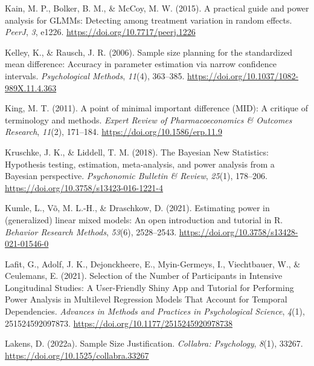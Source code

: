 \documentclass[
  man,
  floatsintext,
  longtable,
  a4paper,
  nolmodern,
  notxfonts,
  notimes,
  colorlinks=true,linkcolor=blue,citecolor=blue,urlcolor=blue]{apa7}
\newlength{\cslhangindent}
\newenvironment{CSLReferences}[2] %
 {\begin{list}{}{%
  \setlength{\itemindent}{0pt}
  \setlength{\leftmargin}{0pt}
  \setlength{\parsep}{0pt}
  \ifodd #1
   \setlength{\leftmargin}{\cslhangindent}
   \setlength{\itemindent}{-1\cslhangindent}
  \fi
  \setlength{\itemsep}{#2\baselineskip}}}
 {\end{list}}
\begin{document}
\begin{CSLReferences}{1}{0}
Kain, M. P., Bolker, B. M., \& McCoy, M. W. (2015). A practical guide
and power analysis for {GLMMs}: Detecting among treatment variation in
random effects. \emph{PeerJ}, \emph{3}, e1226.
\url{https://doi.org/10.7717/peerj.1226}

Kelley, K., \& Rausch, J. R. (2006). Sample size planning for the
standardized mean difference: {Accuracy} in parameter estimation via
narrow confidence intervals. \emph{Psychological Methods}, \emph{11}(4),
363--385. \url{https://doi.org/10.1037/1082-989X.11.4.363}

King, M. T. (2011). A point of minimal important difference ({MID}): A
critique of terminology and methods. \emph{Expert Review of
Pharmacoeconomics \& Outcomes Research}, \emph{11}(2), 171--184.
\url{https://doi.org/10.1586/erp.11.9}

Kruschke, J. K., \& Liddell, T. M. (2018). The {Bayesian New
Statistics}: {Hypothesis} testing, estimation, meta-analysis, and power
analysis from a {Bayesian} perspective. \emph{Psychonomic Bulletin \&
Review}, \emph{25}(1), 178--206.
\url{https://doi.org/10.3758/s13423-016-1221-4}

Kumle, L., Võ, M. L.-H., \& Draschkow, D. (2021). Estimating power in
(generalized) linear mixed models: {An} open introduction and tutorial
in {R}. \emph{Behavior Research Methods}, \emph{53}(6), 2528--2543.
\url{https://doi.org/10.3758/s13428-021-01546-0}

Lafit, G., Adolf, J. K., Dejonckheere, E., Myin-Germeys, I.,
Viechtbauer, W., \& Ceulemans, E. (2021). Selection of the {Number} of
{Participants} in {Intensive Longitudinal Studies}: {A User-Friendly
Shiny App} and {Tutorial} for {Performing Power Analysis} in {Multilevel
Regression Models That Account} for {Temporal Dependencies}.
\emph{Advances in Methods and Practices in Psychological Science},
\emph{4}(1), 251524592097873.
\url{https://doi.org/10.1177/2515245920978738}

Lakens, D. (2022a). Sample {Size Justification}. \emph{Collabra:
Psychology}, \emph{8}(1), 33267.
\url{https://doi.org/10.1525/collabra.33267}


\end{CSLReferences}
\end{document}
